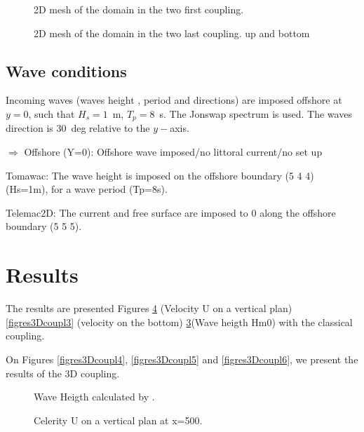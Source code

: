 \begin{figure} [!h]
\centering
{}
 \caption{2D mesh of the domain in the two first coupling.}
\label{3Dcouplingmesh}
\end{figure}

\begin{figure} [!h]
\centering
{}
 \caption{2D mesh of the domain in the two last coupling.  up and \tomawac bottom}
\label{3Dcouplingmesh2}
\end{figure}


\subsection{Wave conditions}
Incoming waves (waves height , period and directions) are imposed offshore at
$y=0$, such that $H_s=1$~m, $T_p=8$~s. The Jonswap spectrum is used. The waves
direction is $30$~deg relative to the $y-$axis.

$\Rightarrow $ Offshore (Y=0): Offshore wave imposed/no littoral current/no
set up

Tomawac:
The wave height is imposed on the offshore boundary (5 4 4) (Hs=1m), for a
wave period (Tp=8s).

Telemac2D:
The current and free surface are imposed to 0 along the offshore boundary
(5 5 5).

\section{Results}
The results are presented Figures \ref{figres3Dcoupl2} (Velocity U on a
vertical plan) \ref{figres3Dcoupl3} (velocity on the bottom)
\ref{figres3Dcoupl}(Wave heigth Hm0) with the classical coupling.

On Figures \ref{figres3Dcoupl4}, \ref{figres3Dcoupl5} and \ref{figres3Dcoupl6},
we present the results of the 3D coupling. 

\begin{figure} [!h]
\centering
{}
 \caption{Wave Heigth calculated by \tomawac.}
\label{figres3Dcoupl}
\end{figure}

\begin{figure} [!h]
\centering
{}
 \caption{Celerity U on a vertical plan at x=500.}
\label{figres3Dcoupl2}
\end{figure}

